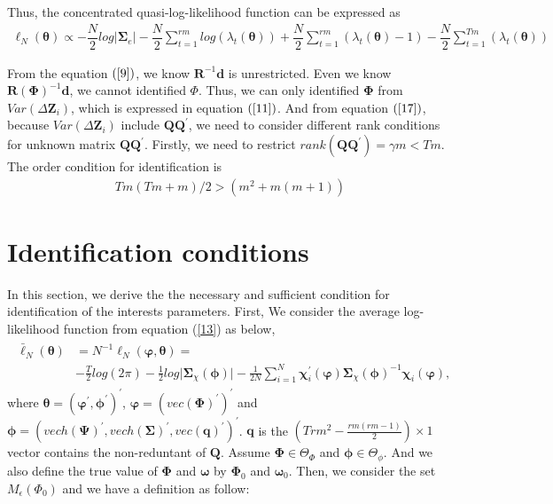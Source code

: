 \documentclass[12pt,a4paper,hyperref]{article}
\begin{document}
Thus, the concentrated quasi-log-likelihood function can be expressed as
\begin{align}
\ell_{N} ( \boldsymbol{\theta})\propto -\dfrac{N}{2}log \vert \boldsymbol{\Sigma}_{e}   \vert-\dfrac{N}{2}\sum^{rm}_{t=1}log \left( \lambda_{t}(\boldsymbol{\theta}) \right) +\dfrac{N}{2} \sum_{t=1}^{rm}\left(\lambda_{t}(\boldsymbol{\theta})-1  \right)-\dfrac{N}{2}\sum_{t=1}^{Tm} \left( \lambda_{t}(\boldsymbol{\theta}) \right) \label{29}
\end{align}







From the equation $(\ref{9})$, we know $\boldsymbol{R}^{-1}\boldsymbol{d}$ is unrestricted. Even we know $\boldsymbol{R\left(\Phi\right)}^{-1}\boldsymbol{d}$, we cannot identified $\Phi$. Thus, we can only identified $\boldsymbol{\Phi}$ from $Var(\Delta \boldsymbol{Z}_{i})$, which is expressed in equation $(\ref{11})$. And from equation  $(\ref{17})$, because $Var(\Delta \boldsymbol{Z}_{i})$ include $\boldsymbol{QQ^{'}}$, we need to consider different rank conditions for unknown matrix $\boldsymbol{QQ}^{'}$. Firstly, we need to restrict $rank\left( \boldsymbol{QQ}^{'}\right)=\gamma m < Tm$. The order condition for identification is
\begin{align}
Tm(Tm+m)/2>(m^{2}+m(m+1))
\end{align}



\section{Identification conditions}
In this section, we derive the the necessary and sufficient condition for identification of the interests parameters.  First, We consider the average log-likelihood function from equation (\ref{13}) as below,
\begin{align}
\begin{split}
\bar{\ell}_{N}\left(\boldsymbol{\theta}\right)&=N^{-1} \ell_{N}(\boldsymbol{\varphi}, \boldsymbol{\theta})= \\
&-\frac{T}{2}log(2 \pi)-\frac{1}{2}log \vert \boldsymbol{\Sigma}_{\chi}(\boldsymbol{\phi}) \vert-\frac{1}{2N}\sum^{N}_{i=1} \boldsymbol{\chi}^{'}_{i}(\boldsymbol{\varphi})\boldsymbol{\Sigma}_{\chi}(\boldsymbol{\phi})^{-1}\boldsymbol{\chi}_{i}(\boldsymbol{\varphi}), \label{40}
\end{split}
\end{align}
where $\boldsymbol{\theta}=(\boldsymbol{\varphi}^{'}, \boldsymbol{\phi}^{'})^{'}$, $\boldsymbol{\varphi}=( vec(\boldsymbol{\Phi})^{'})^{'}$ and $\boldsymbol{\phi}=(vech(\boldsymbol{\Psi})^{'}, vech(\boldsymbol{\Sigma})^{'},vec(\boldsymbol{q})^{'})^{'}$.
$\boldsymbol{q}$ is the $(Trm^{2}-\frac{rm(rm-1)}{2}) \times 1$ vector contains the non-reduntant of $\boldsymbol{Q}$. Assume  $\boldsymbol{\Phi} \in \Theta_{\Phi}$ and $\boldsymbol{\phi} \in \Theta_{\phi}$. And we also define the true value of $ \boldsymbol{\Phi}$ and $\boldsymbol{\omega}$ by $\boldsymbol{\Phi}_{0}$ and $\boldsymbol{\omega}_{0}.$
Then, we consider the set $M_{\epsilon}(\Phi_{0})$ and we have a definition as follow:
\end{document}
